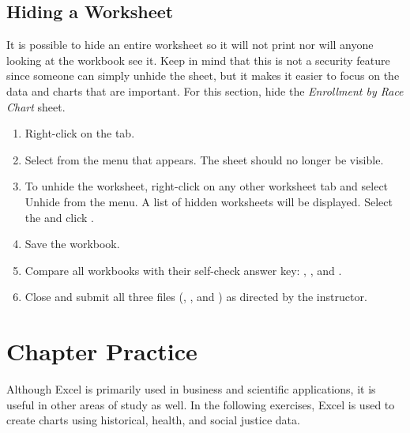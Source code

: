 \subsection{Hiding a Worksheet}

It is possible to hide an entire worksheet so it will not print nor will anyone looking at the workbook see it. Keep in mind that this is not a security feature since someone can simply unhide the sheet, but it makes it easier to focus on the data and charts that are important. For this section, hide the \textit{Enrollment by Race Chart} sheet.

\begin{enumerate}
	\item Right-click on the  tab.
	\item Select  from the menu that appears. The  sheet should no longer be visible.
	\item To unhide the worksheet, right-click on any other worksheet tab and select Unhide from the menu. A list of hidden worksheets will be displayed. Select the  and click .
	\item Save the  workbook.
	\item Compare all workbooks with their self-check answer key: , , and .
	\item Close and submit all three files (, , and ) as directed by the instructor.
\end{enumerate}

\section{Chapter Practice}

Although Excel is primarily used in business and scientific applications, it is useful in other areas of study as well. In the following exercises, Excel is used to create charts using historical, health, and social justice data.

